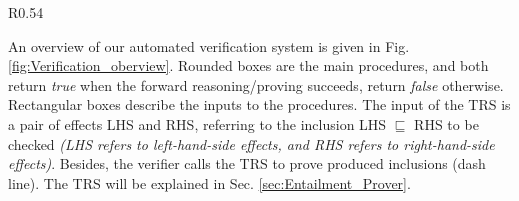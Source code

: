\documentclass[acmsmall,10pt,review]{acmart}
\newcommand{\code}[1]{{\tt{\ensuremath{\m{#1}}}}}
\newcommand{\CONTAIN}{\sqsubseteq}
\newcommand{\m}{\mathit}
\newcommand\figref[1]{Fig. \textcolor{black}{\ref{#1}}.}
\newcommand\secref[1]{Sec. \textcolor{black}{\ref{#1}}}
\begin{document}
{\begin{wrapfigure}{R}{0.54\columnwidth}




\caption{\label{fig:Verification_oberview}System Overview.}
\end{wrapfigure}

An overview of our automated verification system is given 
in \figref{fig:Verification_oberview} 
Rounded boxes are the main procedures, and both return \emph{true} 
when the forward reasoning/proving succeeds, return \emph{false} 
otherwise. Rectangular boxes describe the inputs to the procedures.
The input of the TRS is a pair of effects LHS and RHS, referring to the 
inclusion LHS \code{\CONTAIN} RHS to be checked 
\textit{(LHS refers to left-hand-side effects, and RHS refers to right-hand-side 
effects)}. 
Besides, the verifier calls the TRS to prove produced inclusions (dash line). 
The TRS will be explained in \secref{sec:Entailment_Prover}. 



}
\end{document}
